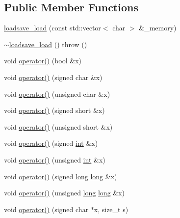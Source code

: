 \subsection*{Public Member Functions}
\begin{DoxyCompactItemize}
\item 
\hyperlink{classgambatte_1_1loadsave__load_a8a06e288abaaf2196cf2bfe9ad5c1615}{loadsave\+\_\+load} (const std\+::vector$<$ char $>$ \&\+\_\+memory)
\item 
\hyperlink{classgambatte_1_1loadsave__load_a5d635194474a2c4e315e2dddd5e8f116}{$\sim$loadsave\+\_\+load} ()  throw ()
\item 
void \hyperlink{classgambatte_1_1loadsave__load_a551d7c208300ff066c9725c3efff8aa9}{operator()} (bool \&x)
\item 
void \hyperlink{classgambatte_1_1loadsave__load_ae0135e997f4fac56481edb91a3b4e6c0}{operator()} (signed char \&x)
\item 
void \hyperlink{classgambatte_1_1loadsave__load_a1e6642fca66ae4b43af93815c69d5aba}{operator()} (unsigned char \&x)
\item 
void \hyperlink{classgambatte_1_1loadsave__load_aac3a5c1c4086659f211772d161fb766f}{operator()} (signed short \&x)
\item 
void \hyperlink{classgambatte_1_1loadsave__load_a5350f167b32445f8079dff6d821f91e9}{operator()} (unsigned short \&x)
\item 
void \hyperlink{classgambatte_1_1loadsave__load_ae2291b82a8512c04091f59170e7a866f}{operator()} (signed \hyperlink{ioapi_8h_a787fa3cf048117ba7123753c1e74fcd6}{int} \&x)
\item 
void \hyperlink{classgambatte_1_1loadsave__load_a19ccef4878489e15440e27c0f0614de5}{operator()} (unsigned \hyperlink{ioapi_8h_a787fa3cf048117ba7123753c1e74fcd6}{int} \&x)
\item 
void \hyperlink{classgambatte_1_1loadsave__load_a8102bdbd866f6a0a05273496bed7ed90}{operator()} (signed \hyperlink{ioapi_8h_a3c7b35ad9dab18b8310343c201f7b27e}{long} \hyperlink{ioapi_8h_a3c7b35ad9dab18b8310343c201f7b27e}{long} \&x)
\item 
void \hyperlink{classgambatte_1_1loadsave__load_a18686dd69eb8623d5e4d63f45a4ff7ef}{operator()} (unsigned \hyperlink{ioapi_8h_a3c7b35ad9dab18b8310343c201f7b27e}{long} \hyperlink{ioapi_8h_a3c7b35ad9dab18b8310343c201f7b27e}{long} \&x)
\item 
void \hyperlink{classgambatte_1_1loadsave__load_a0d08f451690c66586668b1e7c4f87fde}{operator()} (signed char $\ast$x, size\+\_\+t s)
\item 

\end{DoxyCompactItemize}
